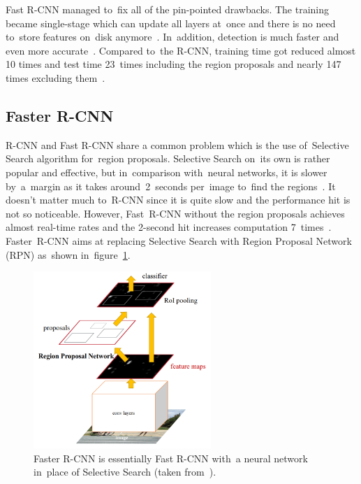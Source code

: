 Fast R-CNN managed to~fix all of the pin-pointed drawbacks. The training became single-stage which can update all layers at~once and there is no need to~store features on~disk anymore~\cite{fast-rcnn}. In~addition, detection is much faster and even more accurate~\cite{fast-rcnn}. Compared to~the R-CNN, training time got reduced almost 10 times and test time 23~times including the region proposals and nearly 147 times excluding them~\cite{stanford-object-detection-lecture}.

\subsection{Faster R-CNN}
\label{algorithms-nn-faster-rcnn}
R-CNN and Fast R-CNN share a common problem which is the use of~Selective Search algorithm for~region proposals. Selective Search on~its own is rather popular and effective, but in~comparison with~neural networks, it is slower by~a~margin as it takes around~2~seconds per~image to~find the regions~\cite{faster-rcnn}. It doesn't matter much to~R-CNN since it is quite slow and the performance hit is not so noticeable. However, Fast~R-CNN without the region proposals achieves almost real-time rates and the 2-second hit increases computation 7~times~\cite{stanford-object-detection-lecture}. Faster~R-CNN aims at replacing Selective Search with Region Proposal Network (RPN) as~shown in~figure~\ref{algorithms-faster-rcnn}.

\begin{figure}[hbt]
    \centering
    \includegraphics[width=0.6\textwidth]{img/algorithms/faster-rcnn.png}
    \caption{Faster R-CNN is essentially Fast R-CNN with~a neural network in~place of Selective Search (taken from~\cite{faster-rcnn}).}
    \label{algorithms-faster-rcnn}
\end{figure}

